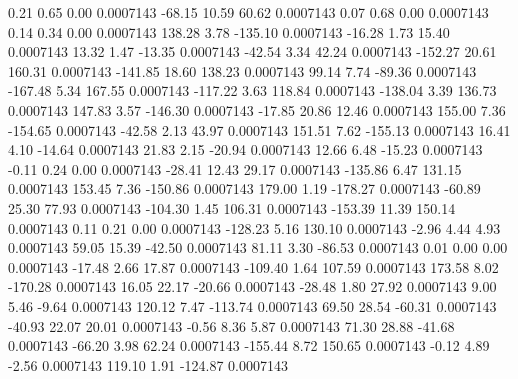         0.21        0.65        0.00     0.0007143
      -68.15       10.59       60.62     0.0007143
        0.07        0.68        0.00     0.0007143
        0.14        0.34        0.00     0.0007143
      138.28        3.78     -135.10     0.0007143
      -16.28        1.73       15.40     0.0007143
       13.32        1.47      -13.35     0.0007143
      -42.54        3.34       42.24     0.0007143
     -152.27       20.61      160.31     0.0007143
     -141.85       18.60      138.23     0.0007143
       99.14        7.74      -89.36     0.0007143
     -167.48        5.34      167.55     0.0007143
     -117.22        3.63      118.84     0.0007143
     -138.04        3.39      136.73     0.0007143
      147.83        3.57     -146.30     0.0007143
      -17.85       20.86       12.46     0.0007143
      155.00        7.36     -154.65     0.0007143
      -42.58        2.13       43.97     0.0007143
      151.51        7.62     -155.13     0.0007143
       16.41        4.10      -14.64     0.0007143
       21.83        2.15      -20.94     0.0007143
       12.66        6.48      -15.23     0.0007143
       -0.11        0.24        0.00     0.0007143
      -28.41       12.43       29.17     0.0007143
     -135.86        6.47      131.15     0.0007143
      153.45        7.36     -150.86     0.0007143
      179.00        1.19     -178.27     0.0007143
      -60.89       25.30       77.93     0.0007143
     -104.30        1.45      106.31     0.0007143
     -153.39       11.39      150.14     0.0007143
        0.11        0.21        0.00     0.0007143
     -128.23        5.16      130.10     0.0007143
       -2.96        4.44        4.93     0.0007143
       59.05       15.39      -42.50     0.0007143
       81.11        3.30      -86.53     0.0007143
        0.01        0.00        0.00     0.0007143
      -17.48        2.66       17.87     0.0007143
     -109.40        1.64      107.59     0.0007143
      173.58        8.02     -170.28     0.0007143
       16.05       22.17      -20.66     0.0007143
      -28.48        1.80       27.92     0.0007143
        9.00        5.46       -9.64     0.0007143
      120.12        7.47     -113.74     0.0007143
       69.50       28.54      -60.31     0.0007143
      -40.93       22.07       20.01     0.0007143
       -0.56        8.36        5.87     0.0007143
       71.30       28.88      -41.68     0.0007143
      -66.20        3.98       62.24     0.0007143
     -155.44        8.72      150.65     0.0007143
       -0.12        4.89       -2.56     0.0007143
      119.10        1.91     -124.87     0.0007143
